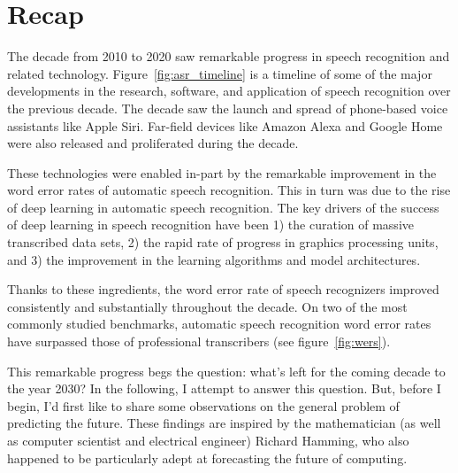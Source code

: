 \section{Recap}
\label{sec:recap}

The decade from 2010 to 2020 saw remarkable progress in speech recognition and
related technology. Figure~\ref{fig:asr_timeline} is a timeline of some of the
major developments in the research, software, and application of speech
recognition over the previous decade. The decade saw the launch and spread of
phone-based voice assistants like Apple Siri. Far-field devices like Amazon
Alexa and Google Home were also released and proliferated during the decade.

These technologies were enabled in-part by the remarkable improvement in the
word error rates of automatic speech recognition. This in turn was due to the
rise of deep learning in automatic speech recognition. The key drivers of the
success of deep learning in speech recognition have been 1) the curation of
massive transcribed data sets, 2) the rapid rate of progress in graphics
processing units, and 3) the improvement in the learning algorithms and model
architectures.

Thanks to these ingredients, the word error rate of speech recognizers improved
consistently and substantially throughout the decade. On two of the most
commonly studied benchmarks, automatic speech recognition word error rates have
surpassed those of professional transcribers (see figure~\ref{fig:wers}).

This remarkable progress begs the question: what's left for the coming
decade to the year 2030? In the following, I attempt to answer this question.
But, before I begin, I'd first like to share some observations on the general
problem of predicting the future. These findings are inspired by the
mathematician (as well as computer scientist and electrical engineer) Richard
Hamming, who also happened to be particularly adept at forecasting the future
of computing.

